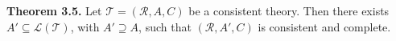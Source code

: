 \textbf{Theorem 3.5.} Let $\mathcal{T} = (\mathcal{R}, A, C)$ be a consistent theory. Then there exists $A' \subseteq \mathcal{L}(\mathcal{T})$, with $A' \supseteq A$, such that $(\mathcal{R}, A', C)$ is consistent and complete.
